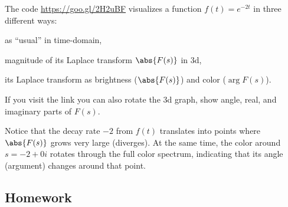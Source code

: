 \begin{weekintro}
\begin{fullwidth}
  The \sage code \url{https://goo.gl/2H2uBF} visualizes a function \(f(t) = e^{-2t}\) in three different ways:
  \begin{inparaenum}[(i)]
  \item as ``usual'' in time-domain,
  \item magnitude of its Laplace transform \(\abs{F(s)}\) in 3d,
  \item its Laplace transform as brightness (\(\abs{F(s)}\)) and color (\(\arg F(s)\)).
  \end{inparaenum}
  If you visit the link you can also rotate the 3d graph, show angle, real, and imaginary parts of \(F(s)\).

  Notice that the decay rate \(-2\) from \(f(t)\) translates into points where \(\abs{F(s)}\) grows  very large (diverges). At the same time, the color around \(s = -2 + 0i\) rotates through the full color spectrum, indicating that its angle (argument) changes around that point.
\end{fullwidth}
\end{weekintro}
\subsection*{Homework}

